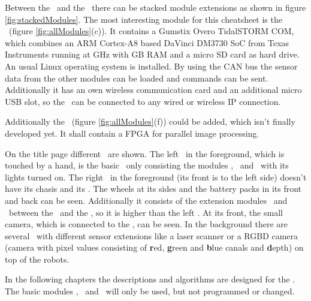 Between the \power\ and the \light\ there can be stacked module extensions as shown in figure \ref{fig:stackedModules}. The most interesting module for this cheatsheet is the \cognition\ (figure \ref{fig:allModules}(c)). It contains a Gumstix Overo TidalSTORM COM, which combines an ARM Cortex-A8 based DaVinci DM3730 SoC from Texas Instruments running at \unit[1]{GHz} with \unit[1]{GB} RAM and a micro SD card as hard drive. An usual Linux operating system is installed. By using the CAN bus the sensor data from the other modules can be loaded and commands can be sent. Additionally it has an own wireless communication card and an additional micro USB slot, so the \cognition\ can be connected to any wired or wireless IP connection.

Additionally the \imageproc\ (figure \ref{fig:allModules}(f)) could be added, which isn't finally developed yet. It shall contain a FPGA for parallel image processing.

On the title page different \amiros\ are shown. The left \amiro\ in the foreground, which is touched by a hand, is the basic \amiro\ only consisting the modules \diwheel, \power\ and \light\ with its lights turned on. The right \amiro\ in the foreground (its front is to the left side) doesn't have its chasis and its \proxring. The wheels at its sides and the battery packs in its front and back can be seen. Additionally it consists of the extension modules \cognition\ and \imageproc\ between the \power\ and the \light, so it is higher than the left \amiro. At its front, the small camera, which is connected to the \cognition, can be seen. In the background there are several \amiros\ with different sensor extensions like a laser scanner or a RGBD camera (camera with pixel values consisting of {\bf r}ed, {\bf g}reen and {\bf b}lue canals and {\bf d}epth) on top of the robots.


In the following chapters the descriptions and algorithms are designed for the \cognition. The basic modules \diwheel, \power\ and \light\ will only be used, but not programmed or changed.

